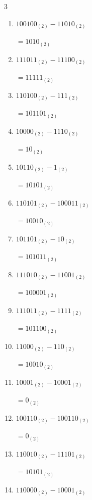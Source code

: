 \begin{multicols}{3}
\begin{enumerate}
        $=100_{(2)}$

  \item $100100_{(2)} - 11010_{(2)}$

        $=1010_{(2)}$

  \item $111011_{(2)} - 11100_{(2)}$

        $=11111_{(2)}$

\columnbreak %

\resetques

  \item $110100_{(2)} - 111_{(2)}$

        $=101101_{(2)}$

  \item $10000_{(2)} - 1110_{(2)}$

        $=10_{(2)}$

  \item $10110_{(2)} - 1_{(2)}$

        $=10101_{(2)}$

  \item $110101_{(2)} - 100011_{(2)}$

        $=10010_{(2)}$

  \item $101101_{(2)} - 10_{(2)}$

        $=101011_{(2)}$

  \item $111010_{(2)} - 11001_{(2)}$

        $=100001_{(2)}$

  \item $111011_{(2)} - 1111_{(2)}$

        $=101100_{(2)}$

  \item $11000_{(2)} - 110_{(2)}$

        $=10010_{(2)}$

  \item $10001_{(2)} - 10001_{(2)}$

        $=0_{(2)}$

  \item $100110_{(2)} - 100110_{(2)}$

        $=0_{(2)}$

\columnbreak %

  \item $110010_{(2)} - 11101_{(2)}$

        $=10101_{(2)}$

  \item $110000_{(2)} - 10001_{(2)}$


\end{enumerate}
\end{multicols}
